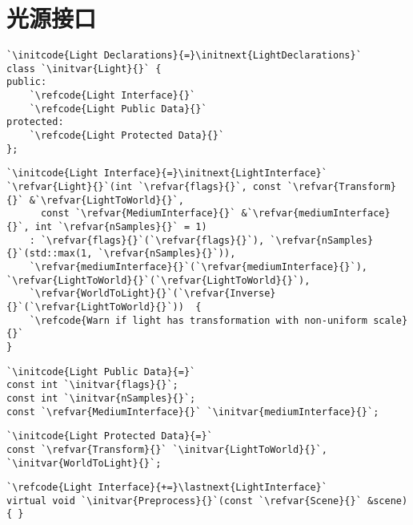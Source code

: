 \section{光源接口}\label{sec:光源接口}

\begin{lstlisting}
`\initcode{Light Declarations}{=}\initnext{LightDeclarations}`
class `\initvar{Light}{}` {
public:
    `\refcode{Light Interface}{}`
    `\refcode{Light Public Data}{}`
protected:
    `\refcode{Light Protected Data}{}`
};
\end{lstlisting}

\begin{lstlisting}
`\initcode{Light Interface}{=}\initnext{LightInterface}`
`\refvar{Light}{}`(int `\refvar{flags}{}`, const `\refvar{Transform}{}` &`\refvar{LightToWorld}{}`,
      const `\refvar{MediumInterface}{}` &`\refvar{mediumInterface}{}`, int `\refvar{nSamples}{}` = 1)
    : `\refvar{flags}{}`(`\refvar{flags}{}`), `\refvar{nSamples}{}`(std::max(1, `\refvar{nSamples}{}`)),
    `\refvar{mediumInterface}{}`(`\refvar{mediumInterface}{}`), `\refvar{LightToWorld}{}`(`\refvar{LightToWorld}{}`),
    `\refvar{WorldToLight}{}`(`\refvar{Inverse}{}`(`\refvar{LightToWorld}{}`))  { 
    `\refcode{Warn if light has transformation with non-uniform scale}{}`
}
\end{lstlisting}

\begin{lstlisting}
`\initcode{Light Public Data}{=}`
const int `\initvar{flags}{}`;
const int `\initvar{nSamples}{}`;
const `\refvar{MediumInterface}{}` `\initvar{mediumInterface}{}`;
\end{lstlisting}

\begin{lstlisting}
`\initcode{Light Protected Data}{=}`
const `\refvar{Transform}{}` `\initvar{LightToWorld}{}`, `\initvar{WorldToLight}{}`;
\end{lstlisting}

\begin{lstlisting}
`\refcode{Light Interface}{+=}\lastnext{LightInterface}`
virtual void `\initvar{Preprocess}{}`(const `\refvar{Scene}{}` &scene) { }
\end{lstlisting}